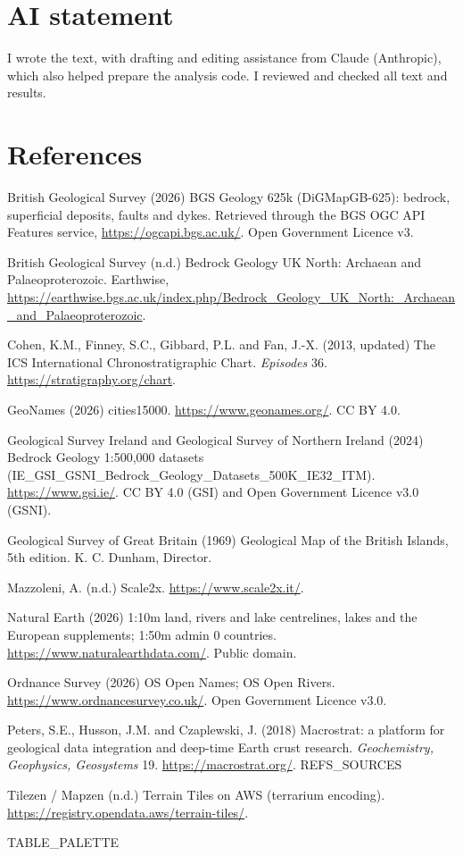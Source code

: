 \documentclass[11pt,a4paper]{article}
\begin{document}
\section*{AI statement}

I wrote the text, with drafting and editing assistance from Claude (Anthropic), which also helped prepare the analysis code. I reviewed and checked all text and results.

\section*{References}
\small
\begin{description}\setlength{\itemsep}{2pt}
\item British Geological Survey (2026) BGS Geology 625k (DiGMapGB-625): bedrock, superficial deposits, faults and dykes. Retrieved through the BGS OGC API Features service, \url{https://ogcapi.bgs.ac.uk/}. Open Government Licence v3.
\item British Geological Survey (n.d.) Bedrock Geology UK North: Archaean and Palaeoproterozoic. Earthwise, \url{https://earthwise.bgs.ac.uk/index.php/Bedrock_Geology_UK_North:_Archaean_and_Palaeoproterozoic}.
\item Cohen, K.M., Finney, S.C., Gibbard, P.L. and Fan, J.-X. (2013, updated) The ICS International Chronostratigraphic Chart. \textit{Episodes} 36. \url{https://stratigraphy.org/chart}.
\item GeoNames (2026) cities15000. \url{https://www.geonames.org/}. CC BY 4.0.
\item Geological Survey Ireland and Geological Survey of Northern Ireland (2024) Bedrock Geology 1:500,000 datasets (IE\_GSI\_GSNI\_Bedrock\_Geology\_Datasets\_500K\_IE32\_ITM). \url{https://www.gsi.ie/}. CC BY 4.0 (GSI) and Open Government Licence v3.0 (GSNI).
\item Geological Survey of Great Britain (1969) Geological Map of the British Islands, 5th edition. K. C. Dunham, Director.
\item Mazzoleni, A. (n.d.) Scale2x. \url{https://www.scale2x.it/}.
\item Natural Earth (2026) 1:10m land, rivers and lake centrelines, lakes and the European supplements; 1:50m admin 0 countries. \url{https://www.naturalearthdata.com/}. Public domain.
\item Ordnance Survey (2026) OS Open Names; OS Open Rivers. \url{https://www.ordnancesurvey.co.uk/}. Open Government Licence v3.0.
\item Peters, S.E., Husson, J.M. and Czaplewski, J. (2018) Macrostrat: a platform for geological data integration and deep-time Earth crust research. \textit{Geochemistry, Geophysics, Geosystems} 19. \url{https://macrostrat.org/}.
{{REFS_SOURCES}}
\item Tilezen / Mapzen (n.d.) Terrain Tiles on AWS (terrarium encoding). \url{https://registry.opendata.aws/terrain-tiles/}.
\end{description}

\normalsize
\vspace{1em}
{{TABLE_PALETTE}}
\end{document}
